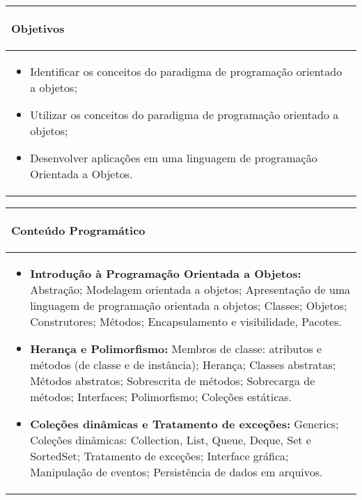 \hspace{1cm}
\begin{table}[h!]
\centering
\begin{small} 
\setlength{\tabcolsep}{3pt} 
\begin{tabular}{|p{15cm}|}\hline

\begin{center}\textbf{Objetivos}\end{center}\\ \hline
\begin{itemize}
\item Identificar os conceitos do paradigma de programação orientado a objetos;
\item Utilizar os conceitos do paradigma de programação orientado a objetos;
\item Desenvolver aplicações em uma linguagem de programação Orientada a Objetos.
\end{itemize}
 \\ \hline

\end{tabular} 
\end{small}
\label{dadosinstituicao}
\end{table}

\hspace{1cm}
\begin{table}[h!]
\centering
\begin{small} 
\setlength{\tabcolsep}{3pt} 
\begin{tabular}{|p{15cm}|}\hline

\begin{center}\textbf{Conteúdo Programático}\end{center}\\ \hline
\begin{itemize}
 \item \textbf{Introdução à Programação Orientada a Objetos:} Abstração; Modelagem orientada a objetos; Apresentação de uma linguagem de programação orientada a objetos;	Classes; Objetos; Construtores; Métodos; Encapsulamento e visibilidade, Pacotes.


 \item \textbf{Herança e Polimorfismo:} Membros de classe: atributos e métodos (de classe e de instância); Herança;	Classes abstratas; Métodos abstratos; Sobrescrita de métodos; Sobrecarga de métodos; Interfaces;	Polimorfismo; Coleções estáticas.

 \item \textbf{Coleções dinâmicas e Tratamento de exceções:} Generics; Coleções dinâmicas: Collection, List, Queue, Deque, Set e SortedSet; Tratamento de exceções; Interface gráfica; Manipulação de eventos; Persistência de dados em arquivos.
\end{itemize}
 \\ \hline

\end{tabular} 
\end{small}
\label{dadosinstituicao}
\end{table}



